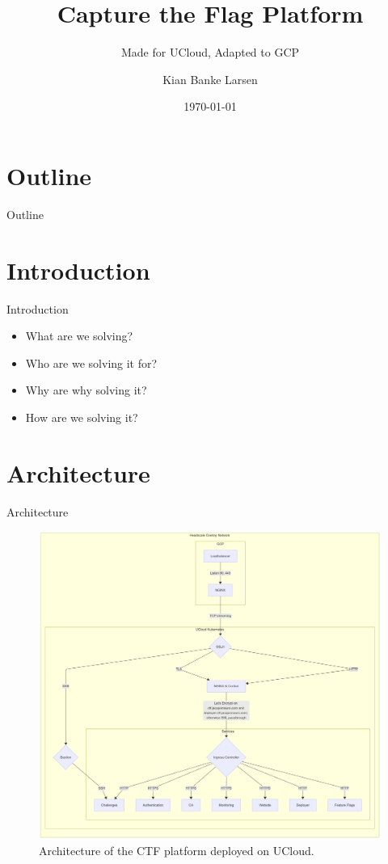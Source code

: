 \documentclass{beamer}
\title{Capture the Flag Platform}
\subtitle{Made for UCloud, Adapted to GCP\\ \vspace{17pt} \vspace{-10pt}}
\author[K. B. Larsen]{Kian Banke Larsen}
\institute{Southern University of Denmark}
\date{\today}
\begin{document}
\begin{frame}
\titlepage
\end{frame}

\section*{Outline}
\begin{frame}{Outline}
\tableofcontents
\end{frame}

\section{Introduction}
\begin{frame}{Introduction}
    \begin{itemize}
        \item What are we solving?
        \item Who are we solving it for?
        \item Why are why solving it?
        \item How are we solving it?
    \end{itemize}
\end{frame}

\section{Architecture}
\begin{frame}{Architecture}
    \begin{figure}
        \centering
        \includegraphics[width=.7\textwidth]{../report/images/ucloud-architecture.png}
        \caption{Architecture of the CTF platform deployed on UCloud.}
    \end{figure}
\end{frame}
\end{document}
